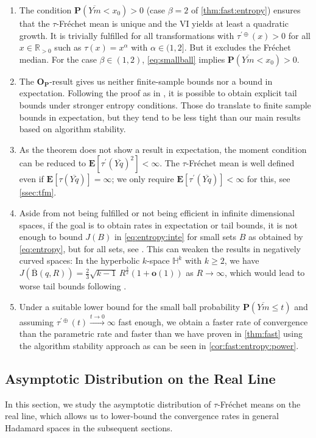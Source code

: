 \documentclass{article}
\newcommand*{\mo}[1]{\mathbf{#1}}
\newcommand{\R}{\mathbb{R}}
\newcommand{\Rpp}{\R_{>0}}
\newcommand{\ball}{\mathrm{B}}
\newcommand{\lb}{\left(} %
\newcommand{\rb}{\right)} %
\newcommand{\br}[1]{\lb #1 \rb} %
\newcommand{\brOf}[1]{\!\br{#1}} %
\renewcommand{\Pr}{\mathbf{P}} %
\newcommand{\Prof}[1]{\Pr(#1)}
\newcommand{\PrOf}[1]{\Pr\brOf{#1}}
\newcommand{\E}{\mathbf{E}} %
\newcommand{\Eof}[1]{\E[#1]}
\newcommand{\pr}{^\prime}
\newcommand{\ol}[2]{\overline{#1#2}}
\newcommand{\tran}{\tau}
\newcommand{\dtran}{\tau\pr}
\newcommand{\ddrtran}{\tau^{\prime\oplus}}
\newcommand{\Op}{\mathbf{O}_{\Pr}}
\newcommand{\ballclosed}{\overline{\ball}}
\begin{document}
\begin{remark}
    \begin{enumerate}[label=(\roman*)]
        \item 
        The condition $\PrOf{\ol Ym < x_0} > 0$ (case $\beta=2$ of \cref{thm:fast:entropy}) ensures that the $\tran$-Fr\'echet mean is unique and the VI yields at least a quadratic growth. It is trivially fulfilled for all transformations with $\ddrtran(x) >0$ for all $x\in\Rpp$ such as $\tran(x)=x^\alpha$ with $\alpha\in (1,2]$. But it excludes the Fr\'echet median. For the case $\beta\in(1,2)$, \eqref{eq:smallball} implies $\PrOf{\ol Ym < x_0} > 0$.
        \item 
        The $\Op$-result gives us neither finite-sample bounds nor a bound in expectation. Following the proof as in \cite{schoetz19}, it is possible to obtain explicit tail bounds under stronger entropy conditions. Those do translate to finite sample bounds in expectation, but they tend to be less tight than our main results based on algorithm stability.
        \item 
        As the theorem does not show a result in expectation, the moment condition can be reduced to $\Eof{\dtran(\ol Yq)^2} < \infty$. The $\tran$-Fr\'echet mean is well defined even if $\Eof{\tran(\ol Yq)} = \infty$; we only require $\Eof{\dtran(\ol Yq)} < \infty$ for this, see \cref{ssec:tfm}.
        \item 
        Aside from not being fulfilled or not being efficient in infinite dimensional spaces, if the goal is to obtain rates in expectation or tail bounds, it is not enough to bound $J(B)$ in \eqref{eq:entropy:inte} for small sets $B$ as obtained by \eqref{eq:entropy}, but for all sets, see \cite{schoetz19}. This can weaken the results in negatively curved spaces: In the hyperbolic $k$-space $\mathbb H^k$ with $k\geq2$, we have
        $J(\ballclosed(q,R)) = \frac23 \sqrt{k-1}\, R^{\frac32} (1 + \mo o(1))$ as $R \to \infty$, which would lead to worse tail bounds following \cite{schoetz19}.
        \item 
        Under a suitable lower bound for the small ball probability $\Prof{\ol Ym \leq t}$ and assuming $\ddrtran(t) \xrightarrow{t\to0}\infty$ fast enough, we obtain a faster rate of convergence than the parametric rate and faster than we have proven in \cref{thm:fast} using the algorithm stability approach as can be seen in \cref{cor:fast:entropy:power}.
    \end{enumerate}
\end{remark}
%
%
%
\subsection{Asymptotic Distribution on the Real Line}
%
In this section, we study the asymptotic distribution of $\tran$-Fr\'echet means on the real line, which allows us to lower-bound the convergence rates in general Hadamard spaces in the subsequent sections.
\end{document}
